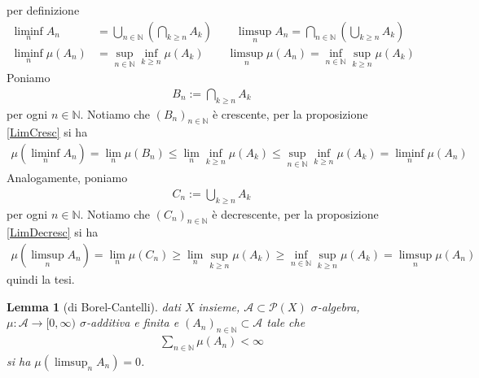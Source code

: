 \documentclass[oneside, 11pt]{amsbook}
\makeatletter
\newcommand{\0}{{(0)}}
\newcommand{\3}{{(3)}}
\theoremstyle{colonplain}
\newtheorem{lemma}[thm]{Lemma}
\theoremstyle{colondefinition}
\theoremstyle{colonremark}
\numberwithin{equation}{chapter}
\renewcommand{\proofname}{Dimostrazione}
\renewenvironment{proof}[1][\proofname]{\par
  \pushQED{\qed}%
  \normalfont \topsep6\p@\@plus6\p@\relax
  \trivlist
  \item[\hskip\labelsep\bfseries #1:]\ignorespaces
}{%
  \popQED\endtrivlist\@endpefalse
}
\makeatother
\begin{document}
\begin{proof}
per definizione
\begin{align}
    \liminf_n A_n &= \bigcup_{n \in \mathbb{N}}\left(\bigcap_{k \geq n} A_k\right) \qquad \limsup_n A_n = \bigcap_{n \in \mathbb{N}}\left(\bigcup_{k \geq n} A_k\right) \\
    \liminf_n \mu(A_n) &= \sup_{n \in \mathbb{N}} \inf_{k \geq n} \mu(A_k) \qquad \limsup_n \mu(A_n) = \inf_{n \in \mathbb{N}} \sup_{k \geq n}\mu(A_k)
\end{align}
Poniamo
\begin{align}
    B_n := \bigcap_{k \geq n} A_k
\end{align}
per ogni $n \in \mathbb{N}$. Notiamo che $(B_n)_{n \in \mathbb{N}}$ è crescente, per la proposizione \ref{LimCresc} si ha
\begin{align}
    \mu(\liminf_n A_n) = \lim_n \mu(B_n) \leq \lim_n \inf_{k \geq n} \mu(A_k) \leq \sup_{n \in \mathbb{N}} \inf_{k \geq n} \mu(A_k) = \liminf_n \mu(A_n)
\end{align}
Analogamente, poniamo
\begin{align}
    C_n := \bigcup_{k \geq n} A_k
\end{align}
per ogni $n \in \mathbb{N}$. Notiamo che $(C_n)_{n \in \mathbb{N}}$ è decrescente, per la proposizione \ref{LimDecresc} si ha
\begin{align}
    \mu(\limsup_n A_n) = \lim_n \mu(C_n) \geq \lim_n \sup_{k \geq n} \mu(A_k) \geq \inf_{n \in \mathbb{N}} \sup_{k \geq n} \mu(A_k) = \limsup_n \mu(A_n)
\end{align}
quindi la tesi.
\end{proof}
\begin{lemma}[di Borel-Cantelli]
dati $X$ insieme, $\mathcal{A} \subset \mathcal{P}(X)$ $\sigma$-algebra, $\mu : \mathcal{A} \longrightarrow [0, \infty)$ $\sigma$-additiva e finita e $(A_n)_{n \in \mathbb{N}} \subset \mathcal{A}$ tale che
\begin{align}
    \sum_{n \in \mathbb{N}} \mu(A_n) < \infty
\end{align}
si ha $\mu(\limsup_n A_n) = 0$.
\end{lemma}
\end{document}
